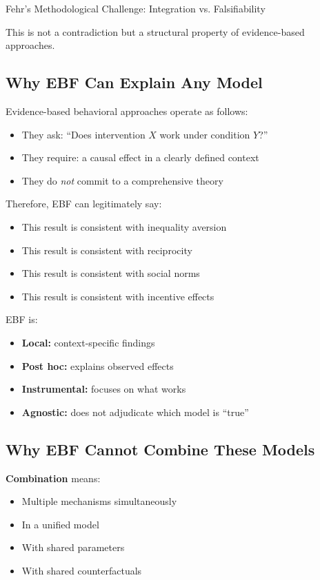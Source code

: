 \begin{chapter}{Fehr's Methodological Challenge: Integration vs. Falsifiability}
\begin{tcolorbox}[colback=red!5!white,colframe=red!75!black,title=\textbf{Central Claim}]
\vspace{0.5em}
This is not a contradiction but a structural property of evidence-based approaches.
\end{tcolorbox}

\subsection{Why EBF Can Explain Any Model}

Evidence-based behavioral approaches operate as follows:
\begin{itemize}[noitemsep]
    \item They ask: ``Does intervention $X$ work under condition $Y$?''
    \item They require: a causal effect in a clearly defined context
    \item They do \textit{not} commit to a comprehensive theory
\end{itemize}

Therefore, EBF can legitimately say:
\begin{itemize}[noitemsep]
    \item This result is consistent with inequality aversion
    \item This result is consistent with reciprocity
    \item This result is consistent with social norms
    \item This result is consistent with incentive effects
\end{itemize}

EBF is:
\begin{itemize}[noitemsep]
    \item \textbf{Local:} context-specific findings
    \item \textbf{Post hoc:} explains observed effects
    \item \textbf{Instrumental:} focuses on what works
    \item \textbf{Agnostic:} does not adjudicate which model is ``true''
\end{itemize}

\subsection{Why EBF Cannot Combine These Models}

\textbf{Combination} means:
\begin{itemize}[noitemsep]
    \item Multiple mechanisms simultaneously
    \item In a unified model
    \item With shared parameters
    \item With shared counterfactuals
\end{itemize}


\end{chapter}
